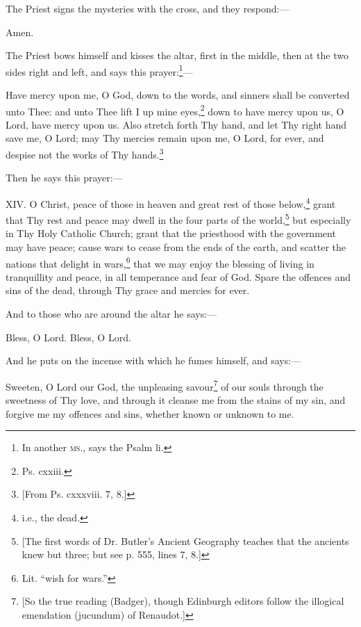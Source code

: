 The Priest signs the mysteries with the cross, and they respond:—

Amen.

The Priest bows himself and kisses the altar, first in the middle, then at the two sides right and left, and says this prayer:\footnote{\par  In another \textsc{ms}., says the Psalm li.}—

Have mercy upon me, O God, down to the words, and sinners shall be converted unto Thee: and unto Thee lift I up mine eyes,\footnote{\par  Ps. cxxiii.} down to have mercy upon us, O Lord, have mercy upon us. Also stretch forth Thy hand, and let Thy right hand save me, O Lord; may Thy mercies remain upon me, O Lord, for ever, and despise not the works of Thy hands.\footnote{\par{}  [From Ps. cxxxviii. 7, 8.]}

Then he says this prayer:—

XIV. O Christ, peace of those in heaven and great rest of those below,\footnote{\par  i.e., the dead.} grant that Thy rest and peace may dwell in the four parts of the world,\footnote{\par{}  [The first words of Dr. Butler’s Ancient Geography teaches that the ancients knew but three; but see p. 555, lines 7, 8.]} but especially in Thy Holy Catholic Church; grant that the priesthood with the government may have peace; cause wars to cease from the ends of the earth, and scatter the nations that delight in wars,\footnote{\par  Lit. “wish for wars.”} that we may enjoy the blessing of living in tranquillity and peace, in all temperance and fear of God. Spare the offences and sins of the dead, through Thy grace and mercies for ever.

And to those who are around the altar he says:—

Bless, O Lord. Bless, O Lord.

And he puts on the incense with which he fumes himself, and says:—

Sweeten, O Lord our God, the unpleasing savour\footnote{\par{}  [So the true reading (Badger), though Edinburgh editors follow the illogical emendation (jucundum) of Renaudot.]} of our souls through the sweetness of Thy love, and through it cleanse me from the stains of my sin, and forgive me my offences and sins, whether known or unknown to me.

